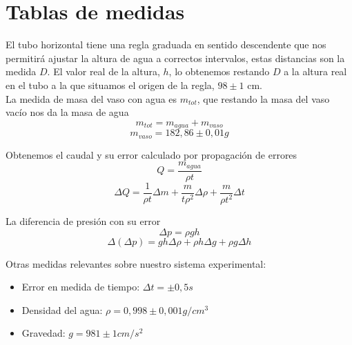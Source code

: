 \documentclass[a4paper,12pt,spanish]{article}
\begin{document}
	\section{Tablas de medidas}
	
	
	El tubo horizontal tiene una regla graduada en sentido descendente que nos permitirá ajustar la altura de agua a correctos intervalos, estas distancias son la medida $D$. El valor real de la altura, $h$, lo obtenemos restando $D$ a la altura real en el tubo a la que situamos el origen de la regla, $98\pm 1 $ cm.\\

	La medida de masa del vaso con agua es $m_{tot}$, que restando la masa del vaso vacío nos da la masa de agua
	\[ m_{tot} = m_{agua} + m_{vaso}
	\]
	\[ m_{vaso} = 182,86 \pm 0,01 \si{g}
	\]
	
	Obtenemos el caudal y su error calculado por propagación de errores
	\[ Q = \frac{m_{agua}}{\rho t}
	\]
	\[\Delta Q = \frac{1}{\rho t} \Delta m+ \frac{m}{t\rho^2}\Delta \rho + \frac{m}{\rho t^2}\Delta t
	\]
	
	La diferencia de presión con su error
	\[ \mathit{\Delta} p = \rho g h
	\]
	\[ \Delta (\mathit{\Delta} p) = g h \Delta \rho + \rho h \Delta g + \rho g \Delta h 
	\]
	
	
	\vspace{\baselineskip}
	
	Otras medidas relevantes sobre nuestro sistema experimental:
	
	\begin{itemize}
		\item Error en medida de tiempo: $\Delta t = \pm 0,5 \si{s}$
		\item Densidad del agua: $\rho = 0,998\pm 0,001 \si{g/cm^3 }$
		\item Gravedad: $g = 981\pm 1 \si{cm/s^2}$
	\end{itemize}
	
	\vspace{\baselineskip}
	
	
	
\end{document}
